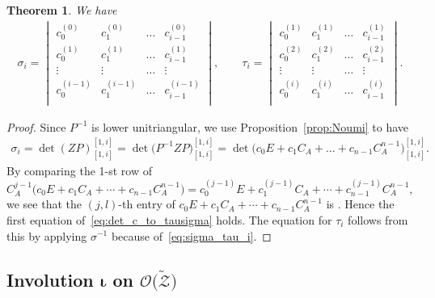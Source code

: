 \documentclass[pdftex]{sigma}
\numberwithin{equation}{section}
\newtheorem{Theorem}{Theorem}[section]
\theoremstyle{definition}
\begin{document}
\begin{Theorem}\label{thm:det_c_to_tausigma}
We have
\begin{equation}\label{eq:det_c_to_tausigma}
\begin{gathered}
\sigma_i=
\begin{vmatrix}
c^{(0)}_{0} & c^{(0)}_{1} & \dots & c^{(0)}_{i-1}\\
c^{(1)}_{0} & c^{(1)}_{1} & \dots & c^{(1)}_{i-1}\\
\vdots & \vdots & \dots & \vdots \\
c^{(i-1)}_{0} & c^{(i-1)}_{1} & \dots & c^{(i-1)}_{i-1}\\
\end{vmatrix}, \qquad
\tau_i=
\begin{vmatrix}
c^{(1)}_{0} & c^{(1)}_{1} & \dots &c^{(1)}_{i-1}\\
c^{(2)}_{0} & c^{(2)}_{1} & \dots &c^{(2)}_{i-1}\\
\vdots & \vdots & \dots & \vdots\\
c^{(i)}_{0} & c^{(i)}_{1} & \dots &c^{(i)}_{i-1}\\
\end{vmatrix}.
\end{gathered}
\end{equation}
\end{Theorem}

\begin{proof}
Since $P^{-1}$ is lower unitriangular, we use
Proposition~\ref{prop:Noumi} to have
\[
\begin{aligned}
\sigma_i=\det(ZP)^{[1,i]}_{[1,i]}
=
\det\bigl(P^{-1}ZP\bigr)^{[1,i]}_{[1,i]}=
\det\bigl(c_0E+c_1C_A+\dots+c_{n-1}C_A^{n-1}\bigr)^{[1,i]}_{[1,i]}.
\end{aligned}
\]
By comparing the 1-st row of
\[
C_A^{j-1}\bigl(c_0E+c_1C_A+\cdots+c_{n-1}C_A^{n-1}\bigr)
=c_0^{(j-1)}E+c_1^{(j-1)}C_A+\cdots+c_{n-1}^{(j-1)}C_A^{n-1},
\]
we see that the
$(j,l)$-th entry of $c_0E+c_1C_A+\cdots+c_{n-1}C_A^{n-1}$
is
.
Hence the first equation of~\eqref{eq:det_c_to_tausigma} holds.
The equation for $\tau_i$ follows from this by applying $\sigma^{-1}$ because of~\eqref{eq:sigma_tau_i}.
\end{proof}

\subsection[Involution iota on O(Z)]{Involution $\boldsymbol{\iota}$ on $\boldsymbol{\mathscr{O}\bigl(\tilde{\mathscr{Z}}\bigr)}$}
\label{sec:iota on OZ}
\end{document}
